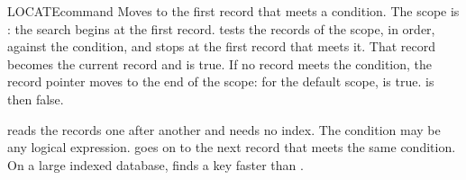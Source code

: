\begin{XbaseEntry}{LOCATE}{command}
Moves to the first record that meets a condition.
\Syntax
{}
\Defaults
The scope is : the search begins at the first record.
\Usage
{} tests the records of the scope, in order, against the 
condition, and stops at the first record that meets it.  That record becomes
the current record and  is true.  If no record meets the
condition, the record pointer moves to the end of the scope: for the default
scope,  is true.   is then false.

 reads the records one after another and needs no index.  The
condition may be any logical expression.   goes on to the next
record that meets the same condition.
\Tips
On a large indexed database,  finds a key faster than .
\Examples
{}
\end{XbaseEntry}

